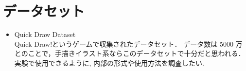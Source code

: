 \documentclass[onecolumn]{ujarticle}   %
\begin{document}
\section{データセット}
\begin{itemize}
  \item Quick Draw Dataset\\
  Quick Draw!というゲームで収集されたデータセット．
  データ数は 5000 万とのことで，手描きイラスト系ならこのデータセットで十分だと思われる．\\
  実験で使用できるように, 内部の形式や使用方法を調査したい.
\end{itemize}




\end{document}
